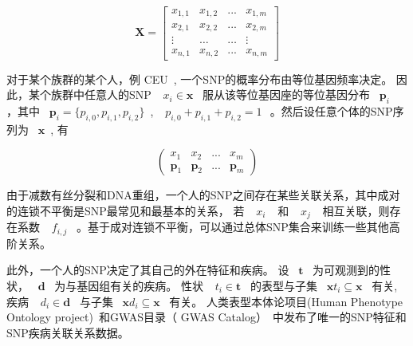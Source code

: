 \begin{equation}
\mathbf{X}=
\left[
\begin{matrix}
x_{1,1} & x_{1,2} & ...    & x_{1,m} \\
x_{2,1} & x_{2,2} & ...    & x_{2,m} \\
\vdots  & \ldots  & \ldots & \vdots  \\
x_{n,1} & x_{n,2} & ...    & x_{n,m}
\end{matrix}
\right]
\end{equation}

对于某个族群的某个人，例 CEU~\cite{auton2015a}, 一个SNP的概率分布由等位基因频率决定。  因此，某个族群中任意人的SNP ~$~x_i \in \mathbf{x}$~ 服从该等位基因座的等位基因分布 ~$\mathbf{p}_i~$~ ，其中 ~$\mathbf{p}_i=\{p_{i,0},p_{i,1}, p_{i,2}\}$~, ~$~p_{i,0}+p_{i,1}+p_{i,2}=1~$~。然后设任意个体的SNP序列为 ~$\mathbf{x}$~, 有

\begin{equation}
\left(
\begin{matrix}
x_1          & x_2 & ... & x_m \\
\mathbf{p}_1 & \mathbf{p}_2 & ... & \mathbf{p}_m
\end{matrix}
\right)
\end{equation}

由于减数有丝分裂和DNA重组，一个人的SNP之间存在某些关联关系，其中成对的连锁不平衡是SNP最常见和最基本的关系， 若 ~$~x_i~$~ 和 ~$~x_j~$~ 相互关联，则存在系数 ~$~f_{i,j}$~ 。基于成对连锁不平衡，可以通过总体SNP集合来训练一些其他高阶关系。

此外，一个人的SNP决定了其自己的外在特征和疾病。 设 ~$\mathbf{t}$~ 为可观测到的性状， ~$\mathbf{d}$~ 为与基因组有关的疾病。  性状 ~$~t_i \in \mathbf{t}$~ 的表型与子集 ~$\mathbf{x}t_i \subseteq \mathbf{x}$~ 有关, 疾病 ~$~d_i \in \mathbf{d}$~ 与子集 ~$\mathbf{x}d_i \subseteq \mathbf{x}$~ 有关。 人类表型本体论项目(Human Phenotype Ontology project)~\cite{koehler2014human}和GWAS目录（ GWAS Catalog）~\cite{macarthur2017the}中发布了唯一的SNP特征和SNP疾病关联关系数据。


